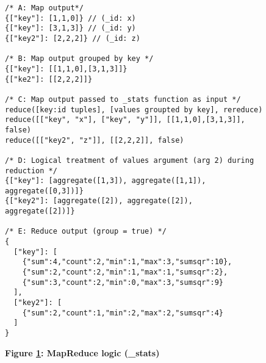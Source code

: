 \begin{figure}[H]
  \centering
  \begin{mdframed}[rightline=true,leftline=true]
    \begin{verbatim}
/* A: Map output*/
{["key"]: [1,1,0]} // (_id: x)
{["key"]: [3,1,3]} // (_id: y)
{["key2"]: [2,2,2]} // (_id: z)

/* B: Map output grouped by key */
{["key"]: [[1,1,0],[3,1,3]]}
{["ke2"]: [[2,2,2]]}

/* C: Map output passed to _stats function as input */
reduce([key:id tuples], [values groupted by key], rereduce)
reduce([["key", "x"], ["key", "y"]], [[1,1,0],[3,1,3]], false)
reduce([["key2", "z"]], [[2,2,2]], false)

/* D: Logical treatment of values argument (arg 2) during reduction */
{["key"]: [aggregate([1,3]), aggregate([1,1]),  aggregate([0,3])]}
{["key2"]: [aggregate([2]), aggregate([2]),  aggregate([2])]}

/* E: Reduce output (group = true) */
{
  ["key"]: [
    {"sum":4,"count":2,"min":1,"max":3,"sumsqr":10},
    {"sum":2,"count":2,"min":1,"max":1,"sumsqr":2},
    {"sum":3,"count":2,"min":0,"max":3,"sumsqr":9}
  ],
  ["key2"]: [
    {"sum":2,"count":1,"min":2,"max":2,"sumsqr":4}
  ]
}
    \end{verbatim}
  \end{mdframed}
  \caption[MapReduce logic (\_stats)]{\textbf{Figure \ref{fig-stats-reduce-fn}: MapReduce logic (\_stats)}}
  \label{fig-stats-reduce-fn}
\end{figure}